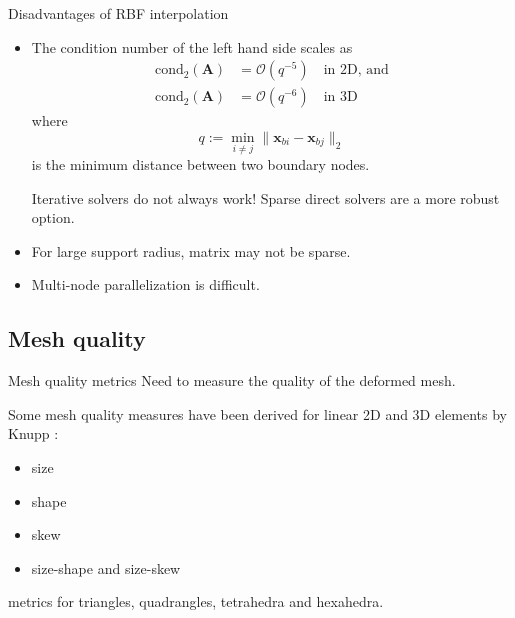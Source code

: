 \documentclass[t,12pt]{beamer}
\let\bld\boldsymbol
\begin{document}
\begin{frame}{Disadvantages of RBF interpolation}
\begin{itemize}
	\item The condition number of the left hand side scales as
	\begin{equation}
	\begin{aligned}
	\text{cond}_2 (\bld{A}) &= \mathcal{O}(q^{-5}) \quad \text{in 2D, and} \\
	\text{cond}_2 (\bld{A}) &= \mathcal{O}(q^{-6}) \quad \text{in 3D}
	\end{aligned}
	\end{equation}
	where
	\begin{equation}
	q := \min_{i\neq j} \lVert \bld{x}_{bi} - \bld{x}_{bj} \rVert_2
	\end{equation}
	is the minimum distance between two boundary nodes.
	
	Iterative solvers do not always work! Sparse direct solvers are a more robust option.
	\item For large support radius, matrix may not be sparse.
	\item Multi-node parallelization is difficult.
\end{itemize}
\end{frame}

\subsection{Mesh quality}
\begin{frame}{Mesh quality metrics}
Need to measure the quality of the deformed mesh.

Some mesh quality measures have been derived for linear 2D and 3D elements by Knupp : 
\begin{itemize}
\item size 
\item shape 
\item skew 
\item size-shape and size-skew
\end{itemize}
metrics for triangles, quadrangles, tetrahedra and hexahedra.
\end{frame}
\end{document}
